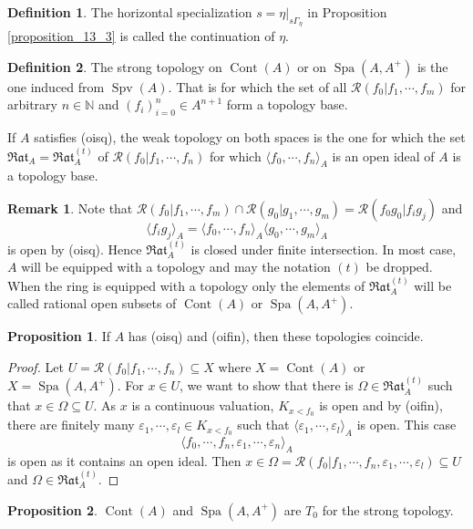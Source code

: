 \documentclass[10pt]{article}
\numberwithin{equation}{section}
\theoremstyle{definition}
\newtheorem{proposition}{Proposition}[subsection]
\newtheorem{definition}{Definition}[subsection]
\newtheorem{remark}{Remark}[subsection]
\DeclareMathOperator{\Spa}{Spa}
\DeclareMathOperator{\Spv}{Spv}
\DeclareMathOperator{\Cont}{Cont}
\newcommand{\N}[0]{\mathbb{N}}
\newcommand{\cR}[0]{\mathcal{R}}
\newcommand{\Rat}[0]{\mathfrak{Rat}}
\begin{document}
\begin{definition}
    The horizontal specialization $s = \eta|_{s\Gamma_\eta}$ in Proposition \ref{proposition_13_3} is called the continuation of $\eta$.
\end{definition}
\begin{definition}
    \label{definition_14_5}
    The strong topology on $\Cont(A)$ or on $\Spa(A,A^+)$ is the one induced from $\Spv(A)$. That is for which the set of all $\cR(f_0|f_1,\cdots,f_m)$ for arbitrary $n\in\N$ and $(f_i)_{i=0}^n\in A^{n+1}$ form a topology base.
    \par If $A$ satisfies (oisq), the weak topology on both spaces is the one for which the set $\Rat_A = \Rat_A^{(t)}$ of $\cR(f_0|f_1,\cdots,f_n)$ for which $\langle f_0,\cdots,f_n\rangle_A$ is an open ideal of $A$ is a topology base.
\end{definition}

\begin{remark}
    Note that $\cR(f_0|f_1,\cdots,f_m)\cap\cR(g_0|g_1,\cdots,g_m) = \cR(f_0g_0|f_ig_j)$ and
    \begin{equation*}
        \langle f_ig_j\rangle_A = \langle f_0,\cdots,f_n \rangle_A \langle g_0,\cdots,g_m\rangle_A
    \end{equation*}
    is open by (oisq). Hence $\Rat_A^{(t)}$ is closed under finite intersection. In most case, $A$ will be equipped with a topology and may the notation $(t)$ be dropped.
    When the ring is equipped with a topology only the elements of $\Rat_A^{(t)}$ will be called rational open subsets of $\Cont(A)$ or $\Spa(A,A^+)$.
\end{remark}
\begin{proposition}
    \label{fact_14_9}
    If $A$ has (oisq) and (oifin), then these topologies coincide.
\end{proposition}
\begin{proof}
    Let $U = \cR(f_0|f_1,\cdots,f_n)\subseteq X$ where $X=\Cont(A)$ or $X=\Spa(A,A^+)$. For $x\in U$, we want to show that there is $\Omega\in\Rat_A^{(t)}$ such that $x\in\Omega\subseteq U$. As $x$ is a continuous valuation, $K_{x<f_0}$ is open and by (oifin), there are finitely many $\varepsilon_1,\cdots,\varepsilon_l\in K_{x<f_0}$ such that $\langle \varepsilon_1,\cdots,\varepsilon_l\rangle_A$ is open.
    This case
    \begin{equation*}
        \langle f_0,\cdots,f_n,\varepsilon_1,\cdots,\varepsilon_n\rangle_A
    \end{equation*}
    is open as it contains an open ideal. Then $x\in\Omega=\cR(f_0|f_1,\cdots,f_n,\varepsilon_1,\cdots,\varepsilon_l)\subseteq U$ and $\Omega\in\Rat_A^{(t)}$.
\end{proof}
\begin{proposition}
    \label{fact_14_10}
    $\Cont(A)$ and $\Spa(A,A^+)$ are $T_0$ for the strong topology.
\end{proposition}
\end{document}
